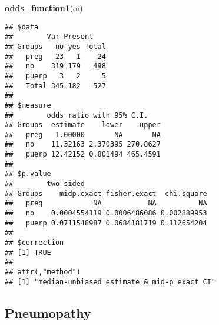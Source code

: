 \documentclass[
]{article}
\newenvironment{Shaded}{\begin{snugshade}}{\end{snugshade}}
\newcommand{\DataTypeTok}[1]{\textcolor[rgb]{0.13,0.29,0.53}{#1}}
\newcommand{\KeywordTok}[1]{\textcolor[rgb]{0.13,0.29,0.53}{\textbf{#1}}}
\newcommand{\NormalTok}[1]{#1}
\newcommand{\OperatorTok}[1]{\textcolor[rgb]{0.81,0.36,0.00}{\textbf{#1}}}
\newcommand{\OtherTok}[1]{\textcolor[rgb]{0.56,0.35,0.01}{#1}}
\newcommand{\StringTok}[1]{\textcolor[rgb]{0.31,0.60,0.02}{#1}}
\begin{document}
\begin{Shaded}
\begin{Highlighting}[]
\KeywordTok{odds_function1}\NormalTok{(oi)}
\end{Highlighting}
\end{Shaded}

\begin{verbatim}
## $data
##        Var Present
## Groups   no yes Total
##   preg   23   1    24
##   no    319 179   498
##   puerp   3   2     5
##   Total 345 182   527
## 
## $measure
##        odds ratio with 95% C.I.
## Groups  estimate    lower    upper
##   preg   1.00000       NA       NA
##   no    11.32163 2.370395 270.8627
##   puerp 12.42152 0.801494 465.4591
## 
## $p.value
##        two-sided
## Groups    midp.exact fisher.exact  chi.square
##   preg            NA           NA          NA
##   no    0.0004554119 0.0006486086 0.002889953
##   puerp 0.0711548987 0.0684181719 0.112654204
## 
## $correction
## [1] TRUE
## 
## attr(,"method")
## [1] "median-unbiased estimate & mid-p exact CI"
\end{verbatim}

\hypertarget{pneumopathy}{%
\subsection{Pneumopathy}\label{pneumopathy}}

\begin{Shaded}
\end{Shaded}

\begin{Shaded}
\end{Shaded}
\end{document}
